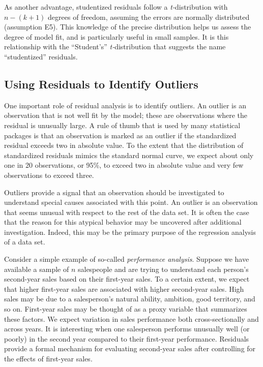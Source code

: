 As another advantage, studentized residuals follow a
\textit{t-}distribution with $n-(k+1)$ degrees of freedom, assuming
the errors are normally distributed (assumption E5). This knowledge
of the precise distribution helps us assess the degree of model fit,
and is particularly useful in small samples. It is this relationship
with the ``Student's'' \textit{t-}distribution that suggests the
name ``studentized'' residuals.

\subsection{Using Residuals to Identify
Outliers}\label{S5:ResidualsOutliers}


One important role of residual analysis is to identify outliers. An
outlier is an observation that is not well fit by the model; these
are observations where the residual is unusually large. A rule of
thumb that is used by many statistical packages is that an
observation is marked as an outlier if the standardized residual
exceeds two in absolute value. To the extent that the distribution
of standardized residuals mimics the standard normal curve, we
expect about only one in 20 observations, or 95\%, to exceed two in
absolute value and very few observations to exceed three.

Outliers provide a signal that an observation should be investigated
to understand special causes associated with this point. An outlier
is an observation that seems unusual with respect to the rest of the
data set. It is often the case that the reason for this atypical
behavior may be uncovered after additional investigation. Indeed,
this may be the primary purpose of the regression analysis of a data
set.

Consider a simple example of so-called \textit{performance
analysis}. Suppose we have available a sample of $n$ salespeople and
are trying to understand each person's second-year sales based on
their first-year sales. To a certain extent, we expect that higher
first-year sales are associated with higher second-year sales. High
sales may be due to a salesperson's natural ability, ambition, good
territory, and so on. First-year sales may be thought of as a proxy
variable that summarizes these factors. We expect variation in sales
performance both cross-sectionally and across years. It is
interesting when one salesperson performs unusually well (or poorly)
in the second year compared to their first-year performance.
Residuals provide a formal mechanism for evaluating second-year
sales after controlling for the effects of first-year sales.

